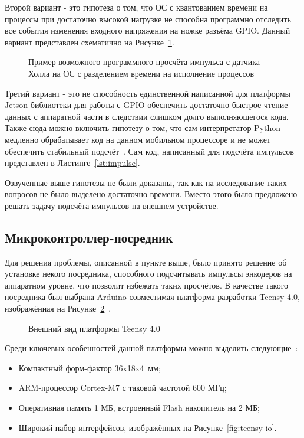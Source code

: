 Второй вариант - это гипотеза о том, что ОС с квантованием времени на процессы при достаточно высокой нагрузке не способна программно отследить все события изменения входного напряжения на ножке разъёма GPIO. Данный вариант представлен схематично на Рисунке~\cref{fig:miscount}.

\begin{figure}[ht]
    \caption{Пример возможного программного просчёта импульса с датчика Холла на ОС с разделением времени на исполнение процессов}\label{fig:miscount}
\end{figure}

Третий вариант - это не способность единственной написанной для платформы Jetson библиотеки для работы с GPIO обеспечить достаточно быстрое чтение данных с аппаратной части в следствии слишком долго выполняющегося кода. Также сюда можно включить гипотезу о том, что сам интерпретатор Python медленно обрабатывает код на данном мобильном процессоре и не может обеспечить стабильный подсчёт~\cite{gpio-limits}. Сам код, написанный для подсчёта импульсов представлен в Листинге~\cref{lst:impulse}.

Озвученные выше гипотезы не были доказаны, так как на исследование таких вопросов не было выделено достаточно времени. Вместо этого было предложено решать задачу подсчёта импульсов на внешнем устройстве.

\subsection{Микроконтроллер-посредник}
Для решения проблемы, описанной в пункте выше, было принято решение об установке некого посредника, способного подсчитывать импульсы энкодеров на аппаратном уровне, что позволит избежать таких просчётов. В качестве такого посредника был выбрана Arduino-совместимая платформа разработки Teensy 4.0, изображённая на Рисунке~\cref{fig:teensy}~\cite{teensy}.

\begin{figure}[ht]
    \caption{Внешний вид платформы Teensy 4.0}\label{fig:teensy}
\end{figure}

Среди ключевых особенностей данной платформы можно выделить следующие~\cite{teensy}:
\begin{itemize}[beginpenalty=10000] %
  \item Компактный форм-фактор 36x18x4~мм;
  \item ARM-процессор Cortex-M7 с таковой частотой 600 МГц;
  \item Оперативная память 1 МБ, встроенный Flash накопитель на 2 МБ;
  \item Широкий набор интерфейсов, изображённых на Рисунке~\cref{fig:teensy-io}.
\end{itemize}

